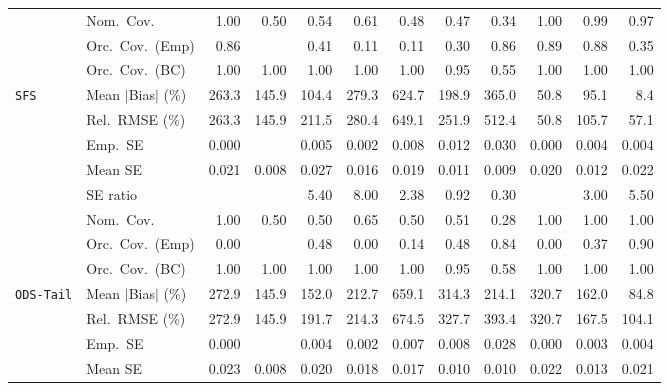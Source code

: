 \begin{landscape}
\begin{longtable}{llrrrrrrrrrr}
 & Nom.\ Cov. & \cellcolor{rankthree}1.00 & 0.50 & 0.54 & 0.61 & 0.48 & 0.47 & 0.34 & 1.00 & \cellcolor{ranktwo}0.99 & \cellcolor{rankone}0.97 \\
 & Orc.\ Cov.\ (Emp) & 0.86 &  & 0.41 & 0.11 & 0.11 & 0.30 & \cellcolor{rankthree}0.86 & \cellcolor{rankone}0.89 & \cellcolor{ranktwo}0.88 & 0.35 \\
 & Orc.\ Cov.\ (BC) & 1.00 & 1.00 & 1.00 & 1.00 & \cellcolor{ranktwo}1.00 & \cellcolor{rankone}0.95 & 0.55 & 1.00 & \cellcolor{rankthree}1.00 & 1.00 \\
\addlinespace[2pt]
\quad \texttt{SFS} & Mean $|$Bias$|$ (\%) & 263.3 & 145.9 & 104.4 & 279.3 & 624.7 & 198.9 & 365.0 & \cellcolor{ranktwo}50.8 & \cellcolor{rankthree}95.1 & \cellcolor{rankone}8.4 \\
 & Rel.\ RMSE (\%) & 263.3 & 145.9 & 211.5 & 280.4 & 649.1 & 251.9 & 512.4 & \cellcolor{rankone}50.8 & \cellcolor{rankthree}105.7 & \cellcolor{ranktwo}57.1 \\
 & Emp.\ SE & 0.000 &  & 0.005 & 0.002 & 0.008 & 0.012 & 0.030 & 0.000 & 0.004 & 0.004 \\
 & Mean SE & 0.021 & 0.008 & 0.027 & 0.016 & 0.019 & 0.011 & 0.009 & 0.020 & 0.012 & 0.022 \\
 & SE ratio &  &  & 5.40 & 8.00 & \cellcolor{rankthree}2.38 & \cellcolor{rankone}0.92 & \cellcolor{ranktwo}0.30 &  & 3.00 & 5.50 \\
 & Nom.\ Cov. & \cellcolor{ranktwo}1.00 & 0.50 & 0.50 & 0.65 & 0.50 & 0.51 & 0.28 & \cellcolor{rankthree}1.00 & \cellcolor{rankone}1.00 & 1.00 \\
 & Orc.\ Cov.\ (Emp) & 0.00 &  & 0.48 & 0.00 & 0.14 & \cellcolor{rankthree}0.48 & \cellcolor{ranktwo}0.84 & 0.00 & 0.37 & \cellcolor{rankone}0.90 \\
 & Orc.\ Cov.\ (BC) & \cellcolor{rankthree}1.00 & 1.00 & 1.00 & 1.00 & \cellcolor{ranktwo}1.00 & \cellcolor{rankone}0.95 & 0.58 & 1.00 & 1.00 & 1.00 \\
\addlinespace[2pt]
\quad \texttt{ODS-Tail} & Mean $|$Bias$|$ (\%) & 272.9 & \cellcolor{ranktwo}145.9 & \cellcolor{rankthree}152.0 & 212.7 & 659.1 & 314.3 & 214.1 & 320.7 & 162.0 & \cellcolor{rankone}84.8 \\
 & Rel.\ RMSE (\%) & 272.9 & \cellcolor{ranktwo}145.9 & 191.7 & 214.3 & 674.5 & 327.7 & 393.4 & 320.7 & \cellcolor{rankthree}167.5 & \cellcolor{rankone}104.1 \\
 & Emp.\ SE & 0.000 &  & 0.004 & 0.002 & 0.007 & 0.008 & 0.028 & 0.000 & 0.003 & 0.004 \\
 & Mean SE & 0.023 & 0.008 & 0.020 & 0.018 & 0.017 & 0.010 & 0.010 & 0.022 & 0.013 & 0.021 \\

\end{longtable}
\end{landscape}
